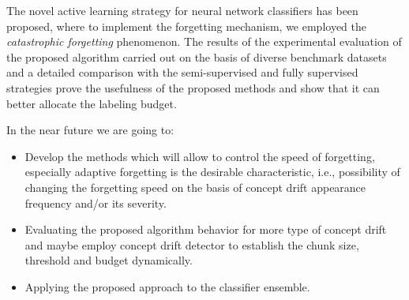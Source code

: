\noindent The novel active learning strategy for neural network classifiers has been proposed, where to implement the forgetting mechanism, we employed the \emph{catastrophic forgetting} phenomenon. The results of the experimental evaluation of the proposed algorithm carried out on the basis of diverse benchmark datasets and a detailed comparison with the semi-supervised and fully supervised strategies prove the usefulness of the proposed methods and show that it can better allocate the labeling budget.%

In the near future we are going to:
\begin{itemize}
\item Develop the methods which will allow to control the speed of forgetting, especially adaptive forgetting is the desirable characteristic, i.e., possibility of changing the forgetting speed on the basis of concept drift appearance frequency and/or its severity.
\item Evaluating the proposed algorithm behavior for more type of concept drift and maybe employ concept drift detector to establish the chunk size, threshold and budget dynamically.
\item Applying the proposed approach to the classifier ensemble.
\end{itemize}
